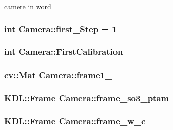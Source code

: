 camere in word 

\hypertarget{classCamera_a5cb30974eb6e3f4e9297dd1dad35c1de}{
\subsubsection[{first\-\_\-\-Step}]{\setlength{\rightskip}{0pt plus 5cm}int Camera\-::first\-\_\-\-Step = 1\hspace{0.3cm}{\ttfamily [static]}}}\label{classCamera_a5cb30974eb6e3f4e9297dd1dad35c1de}
\hypertarget{classCamera_aef0310393843e3bb2692dab6155b69a9}{
\subsubsection[{First\-Calibration}]{\setlength{\rightskip}{0pt plus 5cm}int Camera\-::\-First\-Calibration}}\label{classCamera_aef0310393843e3bb2692dab6155b69a9}
\hypertarget{classCamera_abffda8a107264c8b9a751d2271309347}{
\subsubsection[{frame1\-\_\-}]{\setlength{\rightskip}{0pt plus 5cm}cv\-::\-Mat Camera\-::frame1\-\_\-}}\label{classCamera_abffda8a107264c8b9a751d2271309347}
\hypertarget{classCamera_a3d3770ba9ff2a24ee1bc8f51ebc24586}{
\subsubsection[{frame\-\_\-so3\-\_\-ptam}]{\setlength{\rightskip}{0pt plus 5cm}K\-D\-L\-::\-Frame Camera\-::frame\-\_\-so3\-\_\-ptam}}\label{classCamera_a3d3770ba9ff2a24ee1bc8f51ebc24586}
\hypertarget{classCamera_a752d2cd26036e89172ac9eee430f083c}{
\subsubsection[{frame\-\_\-w\-\_\-c}]{\setlength{\rightskip}{0pt plus 5cm}K\-D\-L\-::\-Frame Camera\-::frame\-\_\-w\-\_\-c}}\label{classCamera_a752d2cd26036e89172ac9eee430f083c}

